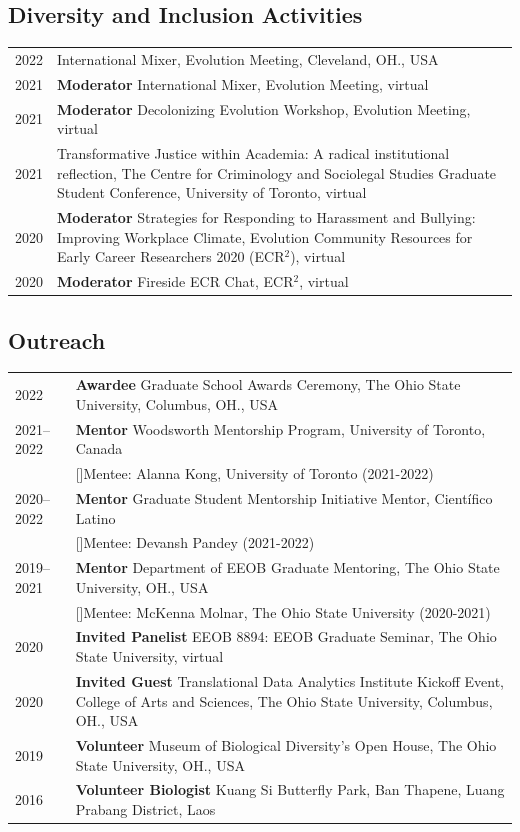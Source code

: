 \documentclass[11pt]{article}
\begin{document}
\subsection*{Diversity and Inclusion Activities}
\begin{longtable}{p{}  p{}}
2022& International Mixer, Evolution Meeting, Cleveland, OH., USA\\
2021& \textbf{Moderator} International Mixer, Evolution Meeting, virtual\\
2021& \textbf{Moderator} Decolonizing Evolution Workshop, Evolution Meeting, virtual\\
2021 & Transformative Justice within Academia: A radical institutional reflection, The Centre for Criminology and Sociolegal Studies Graduate Student Conference, University of Toronto, virtual\\
2020 &	\textbf{Moderator} Strategies for Responding to Harassment and Bullying: Improving Workplace Climate, Evolution Community Resources for Early Career Researchers 2020 (ECR$^2$), virtual\\
2020 &	\textbf{Moderator} Fireside ECR Chat, ECR$^2$, virtual\\
\end{longtable}


\subsection*{Outreach}
\begin{longtable}{p{}  p{}}
2022		& \textbf{Awardee} Graduate School Awards Ceremony, The Ohio State University, Columbus, OH., USA\\
2021--2022 & \textbf{Mentor} Woodsworth Mentorship Program, University of Toronto, Canada\\
		       &[\ding{47}]Mentee: Alanna Kong, University of Toronto (2021-2022)\\
2020--2022& \textbf{Mentor} Graduate Student Mentorship Initiative Mentor, Científico Latino\\
			&[\ding{47}]Mentee: Devansh Pandey (2021-2022)\\
2019--2021 & \textbf{Mentor} Department of EEOB Graduate Mentoring, The Ohio State University, OH., USA \\
		       &[\ding{47}]Mentee: McKenna Molnar, The Ohio State University (2020-2021)\\
2020 &	\textbf{Invited Panelist} EEOB 8894: EEOB Graduate Seminar, The Ohio State University, virtual\\
2020 &	\textbf{Invited Guest} Translational Data Analytics Institute Kickoff Event, College of Arts and Sciences, The Ohio State University, Columbus, OH., USA\\
2019 & \textbf{Volunteer} Museum of Biological Diversity’s Open House, The Ohio State University, OH., USA\\
2016 &  \textbf{Volunteer Biologist} Kuang Si Butterfly Park, Ban Thapene, Luang Prabang District, Laos\vspace{5pt}\\
\end{longtable}
\end{document}
